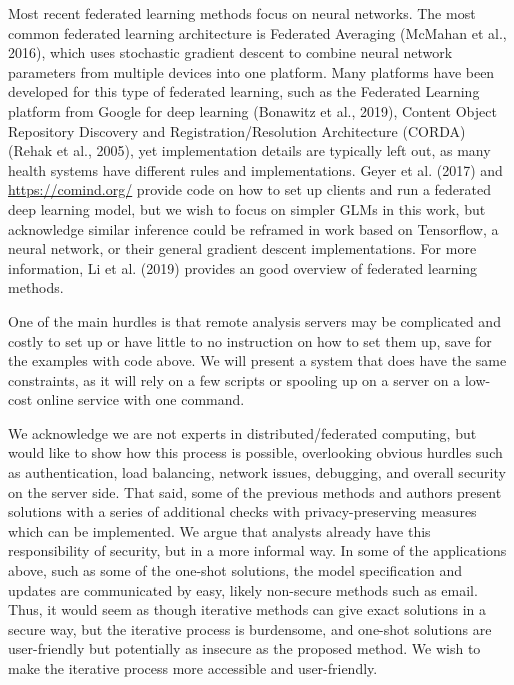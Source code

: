 \documentclass[]{elsarticle} %
\begin{document}
Most recent federated learning methods focus on neural networks. The most common federated learning architecture is Federated Averaging (McMahan et al., 2016), which uses stochastic gradient descent to combine neural network parameters from multiple devices into one platform. Many platforms have been developed for this type of federated learning, such as the Federated Learning platform from Google for deep learning (Bonawitz et al., 2019), Content Object Repository Discovery and Registration/Resolution Architecture (CORDA) (Rehak et al., 2005), yet implementation details are typically left out, as many health systems have different rules and implementations. Geyer et al. (2017) and \url{https://comind.org/} provide code on how to set up clients and run a federated deep learning model, but we wish to focus on simpler GLMs in this work, but acknowledge similar inference could be reframed in work based on Tensorflow, a neural network, or their general gradient descent implementations. For more information, Li et al. (2019) provides an good overview of federated learning methods.

One of the main hurdles is that remote analysis servers may be complicated and costly to set up or have little to no instruction on how to set them up, save for the examples with code above. We will present a system that does have the same constraints, as it will rely on a few scripts or spooling up on a server on a low-cost online service with one command.

We acknowledge we are not experts in distributed/federated computing, but would like to show how this process is possible, overlooking obvious hurdles such as authentication, load balancing, network issues, debugging, and overall security on the server side. That said, some of the previous methods and authors present solutions with a series of additional checks with privacy-preserving measures which can be implemented. We argue that analysts already have this responsibility of security, but in a more informal way. In some of the applications above, such as some of the one-shot solutions, the model specification and updates are communicated by easy, likely non-secure methods such as email. Thus, it would seem as though iterative methods can give exact solutions in a secure way, but the iterative process is burdensome, and one-shot solutions are user-friendly but potentially as insecure as the proposed method. We wish to make the iterative process more accessible and user-friendly.
\end{document}
